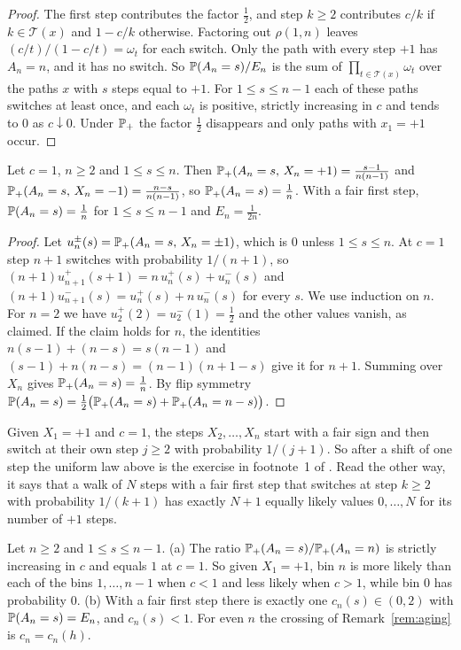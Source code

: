 \begin{proof}
The first step contributes the factor $\frac12$, and step $k\ge2$ contributes $c/k$ if
$k\in\mathcal T(x)$ and $1-c/k$ otherwise. Factoring
out $\rho(1,n)$ leaves $(c/t)/(1-c/t)=\omega_t$ for each switch. Only the path with every step
$+1$ has $A_n=n$, and it has no switch. So $\mathbb{P}(A_n=s)/E_n$ is the sum of
$\prod_{t\in\mathcal T(x)}\omega_t$ over the paths $x$ with $s$ steps equal to $+1$. For
$1\le s\le n-1$ each of these paths switches at least once, and each $\omega_t$ is positive,
strictly increasing in $c$ and tends to $0$ as $c\downarrow0$. Under $\mathbb{P}_+$ the factor
$\frac12$ disappears and only paths with $x_1=+1$ occur.
\end{proof}

\begin{proposition}[exact law at $c=1$]\label{prop:D-uniform}
Let $c=1$, $n\ge2$ and $1\le s\le n$. Then $\mathbb{P}_+(A_n=s,\,X_n=+1)=\frac{s-1}{n(n-1)}$ and
$\mathbb{P}_+(A_n=s,\,X_n=-1)=\frac{n-s}{n(n-1)}$, so $\mathbb{P}_+(A_n=s)=\frac1n$. With a fair first
step, $\mathbb{P}(A_n=s)=\frac1n$ for $1\le s\le n-1$ and $E_n=\frac1{2n}$.
\end{proposition}

\begin{proof}
Let $u^\pm_n(s)=\mathbb{P}_+(A_n=s,\,X_n=\pm1)$, which is $0$ unless $1\le s\le n$. At $c=1$ step
$n+1$ switches with probability $1/(n+1)$, so $(n+1)u^+_{n+1}(s+1)=n\,u^+_n(s)+u^-_n(s)$ and
$(n+1)u^-_{n+1}(s)=u^+_n(s)+n\,u^-_n(s)$ for every $s$. We use induction on $n$. For $n=2$ we
have $u^+_2(2)=u^-_2(1)=\frac12$ and the other values vanish, as claimed. If the claim holds for
$n$, the identities $n(s-1)+(n-s)=s(n-1)$ and $(s-1)+n(n-s)=(n-1)(n+1-s)$ give it for $n+1$.
Summing over $X_n$ gives $\mathbb{P}_+(A_n=s)=\frac1n$. By flip symmetry
$\mathbb{P}(A_n=s)=\frac12\bigl(\mathbb{P}_+(A_n=s)+\mathbb{P}_+(A_n=n-s)\bigr)$.
\end{proof}

Given $X_1=+1$ and $c=1$, the steps $X_2,\dots,X_n$ start with a fair sign and then switch at
their own step $j\ge2$ with probability $1/(j+1)$. So after a shift of one step the uniform law
above is the exercise in footnote~1 of \cite{evw2020}. Read the other way, it says that a walk
of $N$ steps with a fair first step that switches at step $k\ge2$ with probability $1/(k+1)$ has
exactly $N+1$ equally likely values $0,\dots,N$ for its number of $+1$ steps.

\begin{corollary}[crossings]\label{cor:D-fixed}
Let $n\ge2$ and $1\le s\le n-1$. \textup{(a)} The ratio $\mathbb{P}_+(A_n=s)/\mathbb{P}_+(A_n=n)$ is
strictly increasing in $c$ and equals $1$ at $c=1$. So given $X_1=+1$, bin $n$ is more likely
than each of the bins $1,\dots,n-1$ when $c<1$ and less likely when $c>1$, while bin $0$ has
probability $0$. \textup{(b)} With a fair first step there is exactly one
$c_n(s)\in(0,2)$ with $\mathbb{P}(A_n=s)=E_n$, and $c_n(s)<1$. For even $n$ the crossing of
Remark~\ref{rem:aging} is $c_n=c_n(h)$.
\end{corollary}

